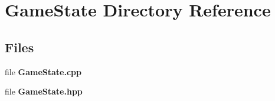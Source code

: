 \section{Game\+State Directory Reference}
\label{dir_ad5ebf44828b4c656083035f2f9871fe}
\subsection*{Files}
\begin{DoxyCompactItemize}
\item 
file \textbf{ Game\+State.\+cpp}
\item 
file \textbf{ Game\+State.\+hpp}
\end{DoxyCompactItemize}
